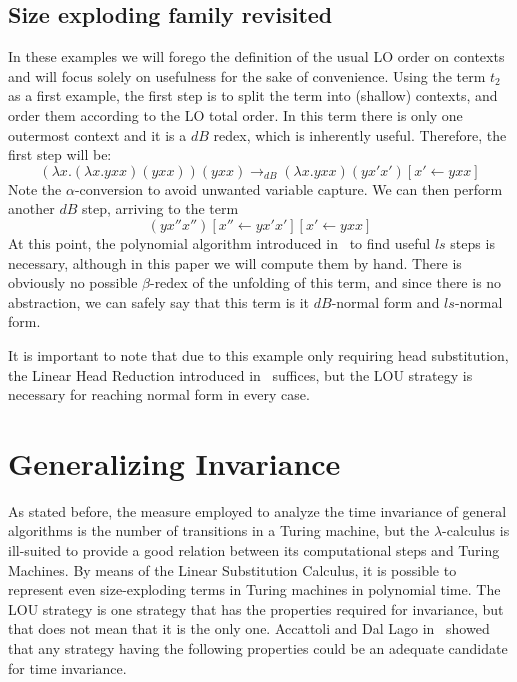 \documentclass[11pt]{article}
\begin{document}
\subsection{Size exploding family revisited}
In these examples we will forego the definition of the usual LO order on contexts and will focus solely on usefulness for the sake of convenience.
Using the term $t_2$ as a first example, the first step is to split the term into (shallow) contexts, and order them according to the LO total order. In this term there is only one outermost context and it is a $dB$ redex, which is inherently useful. Therefore, the first step will be:
\begin{equation*}
  (\lambda x . (\lambda x . yxx) (yxx))(yxx) \rightarrow_{dB} (\lambda x . yxx)(yx'x')[x' \leftarrow yxx]
\end{equation*}
Note the $\alpha$-conversion to avoid unwanted variable capture.
We can then perform another $dB$ step, arriving to the term
\begin{equation*}
  (yx''x'')[x'' \leftarrow yx'x'][x' \leftarrow yxx]
\end{equation*}
At this point, the polynomial algorithm introduced in~\cite{beta-invariance} to find useful $ls$ steps is necessary, although in this paper we will compute them by hand. There is obviously no possible $\beta$-redex of the unfolding of this term, and since there is no abstraction, we can safely say that this term is it $dB$-normal form and $ls$-normal form.

It is important to note that due to this example only requiring head substitution, the Linear Head Reduction introduced in~\cite{invariance-of-cost-model} suffices, but the LOU strategy is necessary for reaching normal form in every case.

\section{Generalizing Invariance}
As stated before, the measure employed to analyze the time invariance of general algorithms is the number of transitions in a Turing machine, but the $\lambda$-calculus is ill-suited to provide a good relation between its computational steps and Turing Machines. By means of the Linear Substitution Calculus, it is possible to represent even size-exploding terms in Turing machines in polynomial time. The LOU strategy is one strategy that has the properties required for invariance,
 but that does not mean that it is the only one. Accattoli and Dal Lago in~\cite{beta-invariance} showed that any strategy having the following properties could be an adequate candidate for time invariance.
\end{document}
